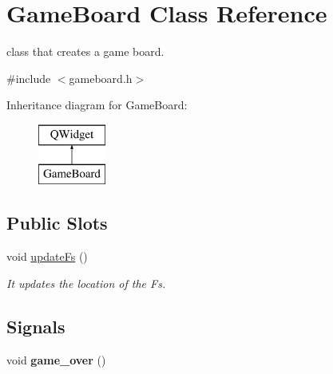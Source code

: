 \hypertarget{class_game_board}{}\section{Game\+Board Class Reference}
\label{class_game_board}


class that creates a game board.  




{\ttfamily \#include $<$gameboard.\+h$>$}

Inheritance diagram for Game\+Board\+:\begin{figure}[H]
\begin{center}
\leavevmode
\includegraphics[height=2.000000cm]{class_game_board}
\end{center}
\end{figure}
\subsection*{Public Slots}
\begin{DoxyCompactItemize}
\item 
void \hyperlink{class_game_board_ae3c962a1819154c9f92910f1010019d3}{update\+Fs} ()
\begin{DoxyCompactList}\small\item\em It updates the location of the F\textquotesingle{}s. \end{DoxyCompactList}\end{DoxyCompactItemize}
\subsection*{Signals}
\begin{DoxyCompactItemize}
\item 
\hypertarget{class_game_board_a82c080b6518e1cf7753e71785c3afdcf}{}void {\bfseries game\+\_\+over} ()\label{class_game_board_a82c080b6518e1cf7753e71785c3afdcf}

\end{DoxyCompactItemize}
